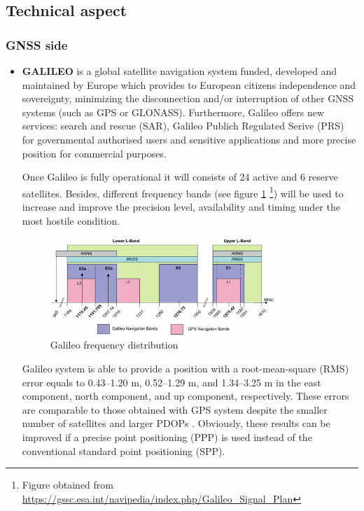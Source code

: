 
\newpage
\subsection{Technical aspect}
\subsubsection{GNSS side}
\begin{itemize}
    \item \textbf{GALILEO} \color{blue} is a global satellite navigation system funded, developed and maintained by Europe which provides to European citizens independence and sovereignty, minimizing the disconnection and/or interruption of other GNSS systems (such as GPS or GLONASS). Furthermore, Galileo offers new services: search and rescue (SAR), Galileo Publich Regulated Serive (PRS) for governmental authorised users and sensitive applications and more precise position for commercial purposes.   
    
    Once Galileo is fully operational it will consists of 24 active and 6 reserve satellites. Besides, different frequency bands (see figure \ref{fig:frequency_plan} \footnote{Figure obtained from \url{https://gssc.esa.int/navipedia/index.php/Galileo_Signal_Plan}}) will be used to increase and improve the precision level, availability and timing under the most hostile condition. 
    
    \begin{figure}
    	\centering
    	\includegraphics[width=0.8\textwidth]{images/Galileo_Frequency_Plan.png}
    	\caption{Galileo frequency distribution}
    	\label{fig:frequency_plan}
    \end{figure} 
    
    Galileo system is able to provide a position with a root-mean-square (RMS) error equals to 0.43–1.20 m, 0.52–1.29 m, and 1.34–3.25 m in the east component, north component, and up component, respectively. These errors are comparable to those obtained with GPS system despite the smaller number of satellites and larger PDOPs \cite{Gal_pos}. Obviously, these results can be improved if a precise point positioning (PPP) is used instead of the conventional standard point positioning (SPP). 


\end{itemize}
